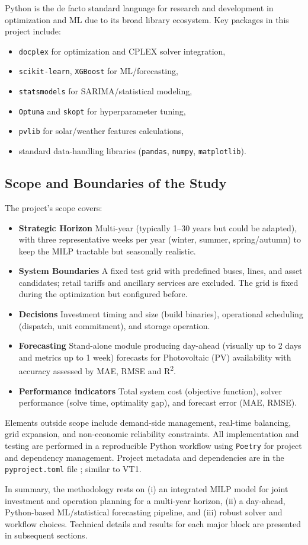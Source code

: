 Python is the de facto standard language for research and development in optimization and ML due to 
its broad library ecosystem. Key packages in this project include:
\begin{itemize}
    \item \texttt{docplex} for optimization and CPLEX solver integration,
    \item \texttt{scikit-learn}, \texttt{XGBoost} for ML/forecasting,
    \item \texttt{statsmodels} for SARIMA/statistical modeling,
    \item \texttt{Optuna} and \texttt{skopt} for hyperparameter tuning,
    \item \texttt{pvlib} for solar/weather features calculations,
    \item standard data-handling libraries (\texttt{pandas}, \texttt{numpy}, \texttt{matplotlib}).
\end{itemize}

\subsection{Scope and Boundaries of the Study}
The project’s scope covers:
\begin{itemize}
    \item \textbf{Strategic Horizon} Multi-year (typically 1--30 years but could be adapted), with three
    representative weeks per year (winter, summer, spring/autumn) to keep the MILP tractable but seasonally realistic.
    \item \textbf{System Boundaries} A fixed test grid with predefined buses, lines, and asset 
    candidates; retail tariffs and ancillary services are excluded. The grid is fixed during 
    the optimization but configured before.
    \item \textbf{Decisions} Investment timing and size (build binaries), operational scheduling 
    (dispatch, unit commitment), and storage operation.
    \item \textbf{Forecasting} Stand-alone module producing day-ahead (visually up to 2 days and 
    metrics up to 1 week) forecasts for Photovoltaic (PV) availability with accuracy assessed by 
    MAE, RMSE and R\textsuperscript{2}.
    \item \textbf{Performance indicators} Total system cost (objective function), solver performance 
    (solve time, optimality gap), and forecast error (MAE, RMSE).
\end{itemize}

Elements outside scope include demand-side management, real-time balancing, grid expansion, and 
non-economic reliability constraints. All implementation and testing are performed in a reproducible 
Python workflow using \texttt{Poetry} for project and dependency management. Project metadata and 
dependencies are in the \texttt{pyproject.toml} file ; similar to VT1.

In summary, the methodology rests on (i) an integrated MILP model for joint investment and operation 
planning for a multi-year horizon, (ii) a day-ahead, Python-based ML/statistical forecasting pipeline, and (iii)
robust solver and workflow choices. Technical details and results for each major block are presented in 
subsequent sections.